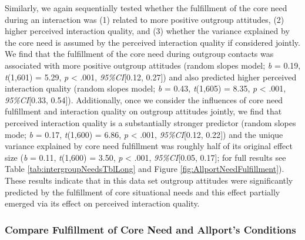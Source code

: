 Similarly, we again sequentially tested whether the fulfillment of the
core need during an interaction was (1) related to more positive
outgroup attitudes, (2) higher perceived interaction quality, and (3)
whether the variance explained by the core need is assumed by the
perceived interaction quality if considered jointly. We find that the
fulfillment of the core need during outgroup contacts was associated
with more positive outgroup attitudes (random slopes model; \textit{b} =
0.19, \textit{t}(1,601) = 5.29, \textit{p} \textless{} .001,
\textit{95\%CI}{[}0.12, 0.27{]}) and also predicted higher perceived
interaction quality (random slopes model; \textit{b} = 0.43,
\textit{t}(1,605) = 8.35, \textit{p} \textless{} .001,
\textit{95\%CI}{[}0.33, 0.54{]}). Additionally, once we consider the
influences of core need fulfillment and interaction quality on outgroup
attitudes jointly, we find that perceived interaction quality is a
substantially stronger predictor (random slopes mode; \textit{b} = 0.17,
\textit{t}(1,600) = 6.86, \textit{p} \textless{} .001,
\textit{95\%CI}{[}0.12, 0.22{]}) and the unique variance explained by
core need fulfillment was roughly half of its original effect size
(\textit{b} = 0.11, \textit{t}(1,600) = 3.50, \textit{p} \textless{}
.001, \textit{95\%CI}{[}0.05, 0.17{]}; for full results see Table
\ref{tab:intergroupNeedsTblLong} and Figure
\ref{fig:AllportNeedFulfillment}). These results indicate that in this
data set outgroup attitudes were significantly predicted by the
fulfillment of core situational needs and this effect partially emerged
via its effect on perceived interaction quality.

\subsubsection{Compare Fulfillment of Core Need and Allport's Conditions}

